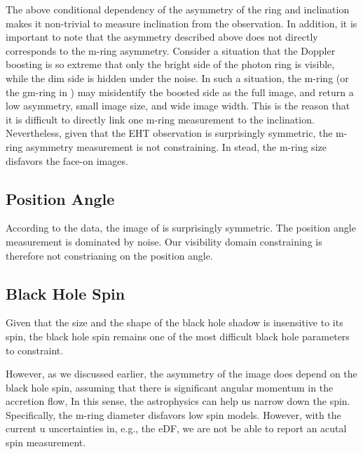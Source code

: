 The above conditional dependency of the asymmetry of the ring and
inclination makes it non-trivial to measure inclination from the
observation.
In addition, it is important to note that the asymmetry described
above does not directly corresponds to the m-ring asymmetry.
Consider a situation that the Doppler boosting is so extreme that only
the bright side of the photon ring is visible, while the dim side is
hidden under the noise.
In such a situation, the m-ring (or the gm-ring in )
may misidentify the boosted side as the full image, and return a low
asymmetry, small image size, and wide image width.
This is the reason that it is difficult to directly link one m-ring
measurement to the inclination.
Nevertheless, given that the EHT observation is surprisingly
symmetric, the m-ring asymmetry measurement is not constraining.
In stead, the m-ring size disfavors the face-on images.

\subsection{Position Angle}


According to the data, the image of \sgra is surprisingly symmetric.
The position angle measurement is dominated by noise.
Our visibility domain constraining is therefore not constrianing on
the position angle.

\subsection{Black Hole Spin}


Given that the size and the shape of the black hole shadow is
insensitive to its spin, the black hole spin remains one of the most
difficult black hole parameters to constraint.

However, as we discussed earlier, the asymmetry of the image does
depend on the black hole spin, assuming that there is significant
angular momentum in the accretion flow, In this sense, the
astrophysics can help us narrow down the spin.
Specifically, the m-ring diameter disfavors low spin models.
However, with the current u uncertainties in, e.g., the eDF, we are
not be able to report an acutal spin measurement.

